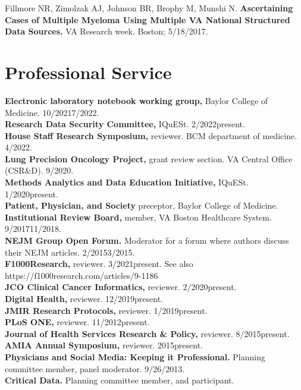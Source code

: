 \documentclass[10pt]{article}
\begin{document}
Fillmore NR, Zimolzak AJ, Johnson BR, Brophy M, Munshi N.
\textbf{Ascertaining Cases of Multiple Myeloma Using Multiple VA
  National Structured Data Sources.} VA Research week. Boston;
5/18/2017.




\section*{Professional Service}

\textbf{Electronic laboratory notebook working group,} Baylor College
of Medicine. 10/2021\ndash{}7/2022.\\
\textbf{Research Data Security Committee,} IQuESt.
2/2022\ndash{}present.\\
\textbf{House Staff Research Symposium,} reviewer. BCM department of
medicine. 4/2022.\\
\textbf{Lung Precision Oncology Project,} grant review section. VA
Central Office  (CSR\&D). 9/2020.\\
\textbf{Methods Analytics and Data Education Initiative,} IQuESt.
1/2020\ndash{}present.\\
\textbf{Patient, Physician, and Society} preceptor, Baylor College of
Medicine.\\
\textbf{Institutional Review Board,} member, VA Boston Healthcare System.
9/2017\ndash{}11/2018.\\
\textbf{NEJM Group Open Forum.} Moderator for a forum where
authors discuss their NEJM articles. 2/2015\ndash{}3/2015.\\
\textbf{F1000Research,} reviewer. 3/2021\ndash{}present. See also
https://f1000research.com/articles/9-1186\\
\textbf{JCO Clinical Cancer Informatics,} reviewer. 2/2020\ndash{}present.\\
\textbf{Digital Health,} reviewer. 12/2019\ndash{}present.\\
\textbf{JMIR Research Protocols,} reviewer. 1/2019\ndash{}present.\\
\textbf{PLoS ONE,} reviewer. 11/2012\ndash{}present.\\
\textbf{Journal of Health Services Research \& Policy,} reviewer.
8/2015\ndash{}present.\\
\textbf{AMIA Annual Symposium,} reviewer. 2015\ndash{}present.\\
\textbf{Physicians and Social Media: Keeping it Professional.}
Planning committee member, panel moderator. 9/26/2013.\\
\textbf{Critical Data.} Planning committee member, and participant.
\end{document}
